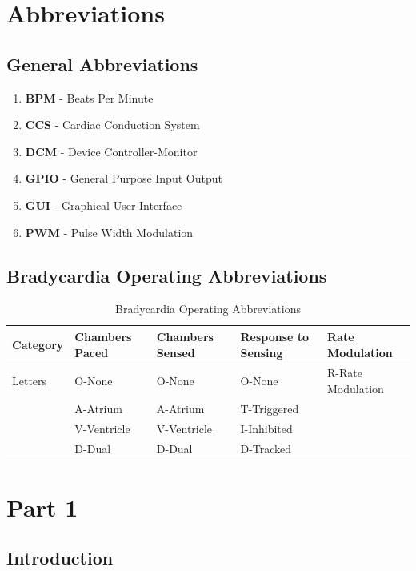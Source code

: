 \documentclass{article}
\begin{document}
\newpage
\section{Abbreviations}
\subsection{General Abbreviations}
\begin{enumerate}[label=]
    \item \textbf{BPM} - Beats Per Minute
    \item \textbf{CCS} - Cardiac Conduction System
    \item \textbf{DCM} - Device Controller-Monitor
    \item \textbf{GPIO} - General Purpose Input Output
    \item \textbf{GUI} - Graphical User Interface
    \item \textbf{PWM} - Pulse Width Modulation
\end{enumerate}

\subsection{Bradycardia Operating Abbreviations}
\begin{table}[H]
    \caption{Bradycardia Operating Abbreviations}
    \begin{tabular}{|m{2cm}|m{2cm}|m{2cm}|m{2cm}|m{3cm}|}
        \hline
        \textbf{Category} & \textbf{Chambers Paced} & \textbf{Chambers Sensed} & \textbf{Response to Sensing} & \textbf{Rate Modulation} \\
        \hline 
        Letters     & O-None & O-None & O-None & R-Rate Modulation\\
                    & A-Atrium & A-Atrium & T-Triggered & \\
                    & V-Ventricle & V-Ventricle & I-Inhibited & \\
                    & D-Dual & D-Dual & D-Tracked & \\
        \hline
    \end{tabular}
\end{table}
\newpage
\section{Part 1}

\subsection{Introduction}
\end{document}
